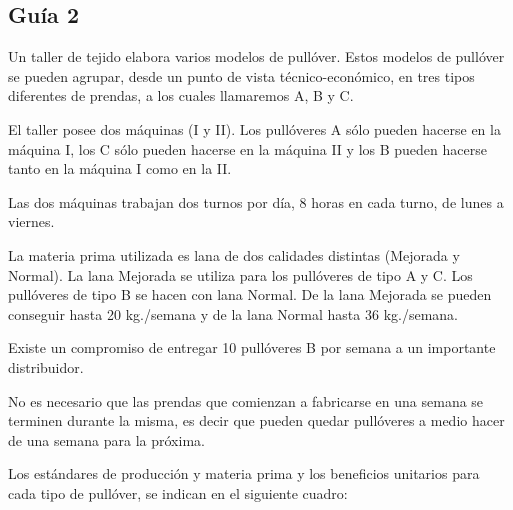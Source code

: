 \documentclass[../main.tex]{subfiles}
\begin{document}
    \subsection{Guía 2}
        \begin{exercise}
            Un taller de tejido elabora varios modelos de pullóver. Estos modelos de pullóver se pueden agrupar, desde un punto de vista técnico-económico, en tres tipos diferentes de prendas, a los cuales llamaremos A, B y C.

            El taller posee dos máquinas (I y II). Los pullóveres A sólo pueden hacerse en la máquina I, los C sólo pueden hacerse en la máquina II y los B pueden hacerse tanto en la máquina I como en la II.

            Las dos máquinas trabajan dos turnos por día, 8 horas en cada turno, de lunes a viernes.

            La materia prima utilizada es lana de dos calidades distintas (Mejorada y Normal). La lana Mejorada se utiliza para los pullóveres de tipo A y C. Los pullóveres de tipo B se hacen con lana Normal. De la lana Mejorada se pueden conseguir hasta 20 kg./semana y de la lana Normal hasta 36 kg./semana.

            Existe un compromiso de entregar 10 pullóveres B por semana a un importante distribuidor.

            No es necesario que las prendas que comienzan a fabricarse en una semana se terminen durante la misma, es decir que pueden quedar pullóveres a medio hacer de una semana para la próxima.

            Los estándares de producción y materia prima y los beneficios unitarios para cada tipo de pullóver, se indican en el siguiente cuadro:


\end{exercise}
\end{document}
